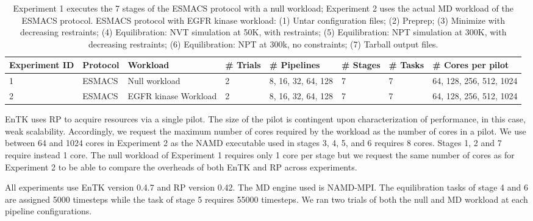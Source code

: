 \begin{table}[t]
\centering
\caption{Experiment 1 executes the 7 stages of the ESMACS protocol with
a null workload; Experiment 2 uses the actual MD workload of the ESMACS
protocol. ESMACS protocol with EGFR kinase workload: (1) Untar configuration
files; (2) Preprep; (3) Minimize with decreasing restraints; (4)
Equilibration: NVT simulation at 50K, with restraints; (5) Equilibration: NPT
simulation at 300K, with decreasing restraints; (6) Equilibration: NPT at
300k, no constraints; (7) Tarball output files.}\label{tab:exp}
\begin{tabular}{llllllll}
\toprule
\textbf{Experiment ID}      &
\textbf{Protocol}           &
\textbf{Workload}           &
\textbf{\# Trials}          &
\textbf{\# Pipelines}       &
\textbf{\# Stages}          &
\textbf{\# Tasks}           &
\textbf{\# Cores per pilot} \\
\toprule
%
1                           &
ESMACS                      &
Null workload               &
2                           &
8, 16, 32, 64, 128          &
7                           &
7                           &
64, 128, 256, 512, 1024     \\
%
2                           &
ESMACS                      &
EGFR kinase Workload        &
2                           &
8, 16, 32, 64, 128          &
7                           &
7                           &
64, 128, 256, 512, 1024     \\
\bottomrule
\end{tabular}
\end{table}

EnTK uses RP to acquire resources via a single pilot. The size of the pilot
is contingent upon characterization of performance, in this case, weak
scalability. Accordingly, we request the maximum number of cores required by
the workload as the number of cores in a pilot. We use between 64 and 1024
cores in Experiment 2 as the NAMD executable used in stages 3, 4, 5, and 6
requires 8 cores. Stages 1, 2 and 7 require instead 1 core. The null workload
of Experiment 1 requires only 1 core per stage but we request the same number
of cores as for Experiment 2 to be able to compare the overheads of both EnTK
and RP across experiments.

All experiments use EnTK version 0.4.7 and RP version 0.42. The MD engine
used is NAMD-MPI\@. The equilibration tasks of stage 4 and 6 are assigned
5000 timesteps while the task of stage 5 requires 55000 timesteps. We ran two
trials of both the null and MD workload at each pipeline configurations.

